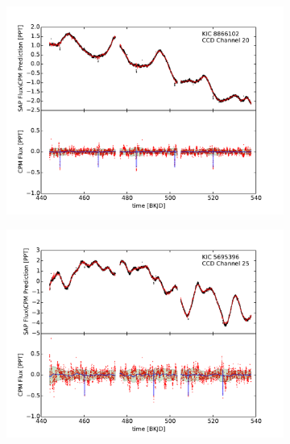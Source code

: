 \documentclass[12pt, preprint]{aastex}
\begin{document}
\begin{figure}[htb]
\begin{subfigure}[htb]{0.33\textwidth}
\end{subfigure}

\begin{subfigure}[htb]{0.33\textwidth}
\includegraphics[width=\textwidth]{kic_8866102}
\end{subfigure}%
\hfill
\begin{subfigure}[htb]{0.33\textwidth}
\includegraphics[width=\textwidth]{kic_5695396}
\end{subfigure}%
\hfill
\begin{subfigure}[htb]{0.33\textwidth}

\end{subfigure}
\end{figure}
\end{document}

